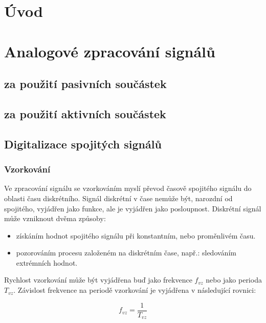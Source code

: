 \documentclass[oneside,12pt,a4paper]{template/SPSTemplate} %
\begin{document}
	\makebeginning

	\tableofcontents
	
	\chapter{Úvod}
	
	\chapter{Analogové zpracování signálů}

		\section{za použití pasivních součástek}		
		
		\section{za použití aktivních součástek}
	
		\section{Digitalizace spojitých signálů}
		
			\subsection{Vzorkování}
		Ve zpracování signálu se vzorkováním myslí převod časově spojitého signálu do oblasti času diskrétního. 
		Signál diskrétní v čase nemůže být, narozdní od spojitého, vyjádřen jako funkce, ale je vyjádřen jako posloupnost.
		Diskrétní signál může vzniknout dvěma způsoby:
		\begin{itemize}
			\item získáním hodnot spojitého signálu při konstantním, nebo proměnlivém času. \cite{discretization_oppenheim}
			\item pozorováním procesu založeném na diskrétním čase, např.: sledováním extrémních hodnot.
		\end{itemize}
		
		
		Rychlost vzorkování může být vyjádřena buď jako frekvence $ f_{vz} $ nebo jako perioda $ T_{vz} $.
		Závislost frekvence na periodě vzorkování je vyjádřena v následující rovnici:
		
		\begin{equation}
		f_{vz} = \frac{1}{T_{vz}}
		\end{equation}
\end{document}
